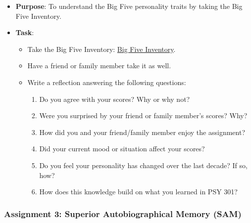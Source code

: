 \documentclass[
]{article}
\providecommand{\tightlist}{%
  \setlength{\itemsep}{0pt}\setlength{\parskip}{0pt}}
\begin{document}
\begin{itemize}
\tightlist
\item
  \textbf{Purpose}: To understand the Big Five personality traits by taking the Big Five Inventory.\\
\item
  \textbf{Task}:

  \begin{itemize}
  \tightlist
  \item
    Take the Big Five Inventory: \href{https://www.outofservice.com/bigfive/}{Big Five Inventory}.\\
  \item
    Have a friend or family member take it as well.\\
  \item
    Write a reflection answering the following questions:

    \begin{enumerate}
    \def\labelenumi{\arabic{enumi}.}
    \tightlist
    \item
      Do you agree with your scores? Why or why not?\\
    \item
      Were you surprised by your friend or family member's scores? Why?\\
    \item
      How did you and your friend/family member enjoy the assignment?\\
    \item
      Did your current mood or situation affect your scores?\\
    \item
      Do you feel your personality has changed over the last decade? If so, how?\\
    \item
      How does this knowledge build on what you learned in PSY 301?
    \end{enumerate}
  \end{itemize}
\end{itemize}

\hypertarget{assignment-3-superior-autobiographical-memory-sam}{%
\subsubsection{Assignment 3: Superior Autobiographical Memory (SAM)}\label{assignment-3-superior-autobiographical-memory-sam}}
\end{document}
